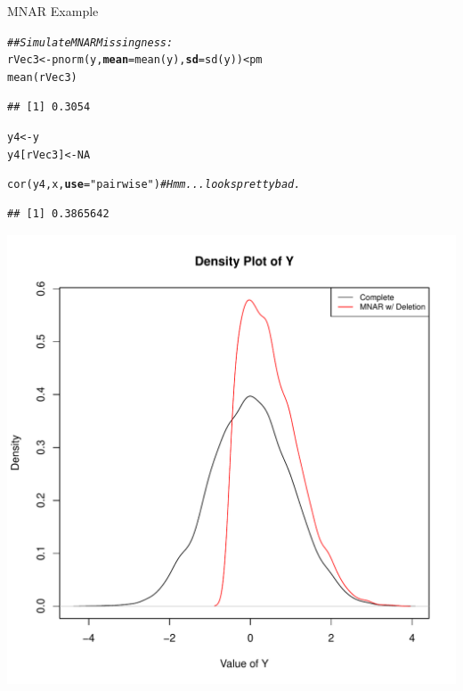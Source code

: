 \documentclass{beamer}\usepackage[]{graphicx}\usepackage[]{color}
\makeatletter
\newcommand{\hlnum}[1]{\textcolor[rgb]{0.69,0.494,0}{#1}}%
\newcommand{\hlstr}[1]{\textcolor[rgb]{0.749,0.012,0.012}{#1}}%
\newcommand{\hlcom}[1]{\textcolor[rgb]{0.514,0.506,0.514}{\textit{#1}}}%
\newcommand{\hlopt}[1]{\textcolor[rgb]{0,0,0}{#1}}%
\newcommand{\hlstd}[1]{\textcolor[rgb]{0,0,0}{#1}}%
\newcommand{\hlkwb}[1]{\textcolor[rgb]{0,0.341,0.682}{#1}}%
\newcommand{\hlkwc}[1]{\textcolor[rgb]{0,0,0}{\textbf{#1}}}%
\newcommand{\hlkwd}[1]{\textcolor[rgb]{0.004,0.004,0.506}{#1}}%
\newenvironment{kframe}{%
 \def\at@end@of@kframe{}%
 \ifinner\ifhmode%
  \def\at@end@of@kframe{\end{minipage}}%
  \begin{minipage}{\columnwidth}%
 \fi\fi%
 \def\FrameCommand##1{\hskip\@totalleftmargin \hskip-\fboxsep
 \colorbox{shadecolor}{##1}\hskip-\fboxsep
     \hskip-\linewidth \hskip-\@totalleftmargin \hskip\columnwidth}%
 \MakeFramed {\advance\hsize-\width
   \@totalleftmargin\z@ \linewidth\hsize
   \@setminipage}}%
 {\par\unskip\endMakeFramed%
 \at@end@of@kframe}
\newenvironment{knitrout}{}{} %
\makeatother
\begin{document}

\begin{frame}{MNAR Example}
  
\begin{knitrout}\footnotesize
{}\color{fgcolor}\begin{kframe}
\begin{alltt}
\hlcom{## Simulate MNAR Missingness:}
\hlstd{rVec3} \hlkwb{<-} \hlkwd{pnorm}\hlstd{(y,} \hlkwc{mean} \hlstd{=} \hlkwd{mean}\hlstd{(y),} \hlkwc{sd} \hlstd{=} \hlkwd{sd}\hlstd{(y))} \hlopt{<} \hlstd{pm}
\hlkwd{mean}\hlstd{(rVec3)}
\end{alltt}
\begin{verbatim}
## [1] 0.3054
\end{verbatim}
\begin{alltt}
\hlstd{y4} \hlkwb{<-} \hlstd{y}
\hlstd{y4[rVec3]} \hlkwb{<-} \hlnum{NA}

\hlkwd{cor}\hlstd{(y4, x,} \hlkwc{use} \hlstd{=} \hlstr{"pairwise"}\hlstd{)} \hlcom{# Hmm...looks pretty bad.}
\end{alltt}
\begin{verbatim}
## [1] 0.3865642
\end{verbatim}
\end{kframe}
\end{knitrout}

\pagebreak

\begin{knitrout}\footnotesize
{}\color{fgcolor}

{\centering \includegraphics[width=0.65\linewidth]{figure/unnamed-chunk-13-1} 

}



\end{knitrout}

\end{frame}
\end{document}
